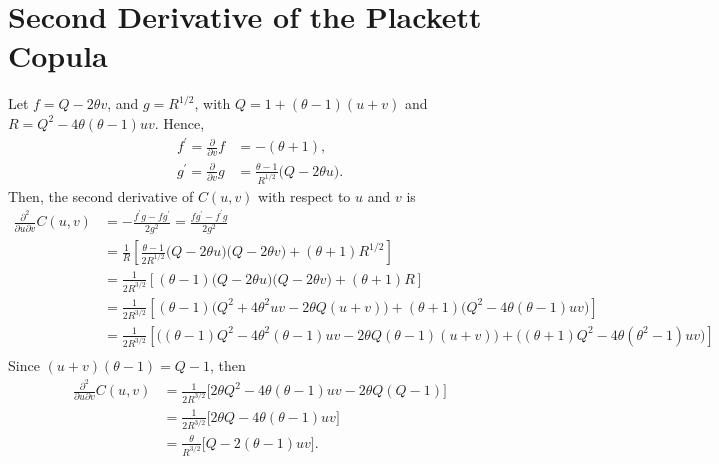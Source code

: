 \documentclass{article}
\begin{document}
\clearpage
\appendix
\section{Second Derivative of the Plackett Copula}
\label{sec:plack2}
Let $f = Q - 2 \theta v$, and $g = R^{1/2}$, 
  with $Q = 1 +(\theta-1)(u+v)$ and $R = Q^2 - 4 \theta(\theta-1)uv$. 
Hence, 
\begin{align}
    f^\prime = \frac{\partial}{\partial v} f &= -(\theta + 1),\\
    g^\prime = \frac{\partial}{\partial v} g 
         &= \frac{\theta-1}{R^{1/2}} \Big(Q - 2 \theta u \Big).
\end{align}
Then, the second derivative of $C(u, v)$
  with respect to $u$ and $v$ is 
\begin{align}
    \frac{\partial^2}{\partial u\partial v}C(u,v)
        &= - \frac{f^\prime g - fg^\prime}{2 g^2}
         = \frac{f g^\prime - f^\prime g}{2 g^2}
        \nonumber\\
        &= \frac1{R}\left[
          \frac{\theta-1}{2 R^{1/2}}
           \Big(Q - 2 \theta u \Big)
            \Big(Q - 2 \theta v \Big) +
            (\theta + 1) R^{1/2}
        \right]
        \nonumber\\
        &= \frac1{2 R^{3/2}}\left[
          (\theta-1) \Big(Q - 2 \theta u \Big) \Big(Q - 2 \theta v \Big) +
            (\theta + 1) R
        \right]
        \nonumber\\
        &= \frac1{2 R^{3/2}}\left[
          (\theta-1) \Big(Q^2 + 4 \theta^2 uv - 2 \theta Q (u + v) \Big) +
            (\theta + 1) \Big( Q^2 - 4 \theta(\theta-1)uv \Big)
        \right]
        \nonumber\\
        &= \frac1{2 R^{3/2}}\left[
          \Big( (\theta-1) Q^2  
            - 4 \theta^2 (\theta-1) uv
            - 2 \theta Q (\theta-1) (u + v)
          \Big) +
          \Big( (\theta + 1) Q^2
            - 4 \theta (\theta^2 - 1) uv
          \Big)
        \right]
        \nonumber\\
\end{align}
Since $(u+v)(\theta-1) = Q - 1$, then
\begin{align}
    \frac{\partial^2}{\partial u\partial v}C(u,v)
        &= \frac1{2 R^{3/2}}\Big[
          2\theta Q^2  
            - 4 \theta (\theta-1) uv
            - 2 \theta Q (Q-1)
        \Big]
        \nonumber\\
        &= \frac1{2 R^{3/2}}\Big[ 2 \theta Q - 4 \theta (\theta-1) uv \Big]
        \nonumber\\
        &= \frac\theta{R^{3/2}}\Big[
            Q - 2(\theta-1)uv\Big].
\end{align}
\end{document}

